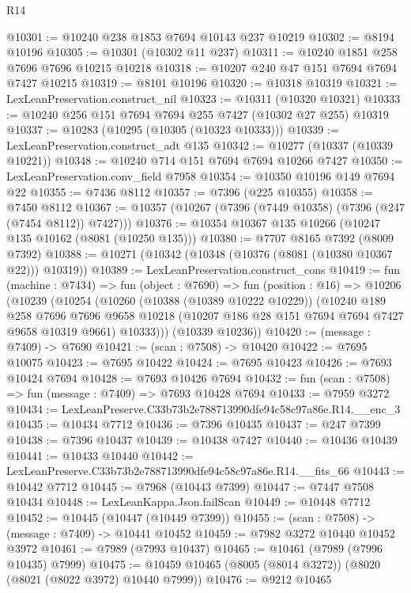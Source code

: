\begin{lexlean}{R14}
\begin{coremodule}
@10301 := @10240 @238 @1853 @7694 @10143 @237 @10219
@10302 := @8194 @10196
@10305 := @10301 (@10302 @11 @237)
@10311 := @10240 @1851 @258 @7696 @7696 @10215 @10218
@10318 := @10207 @240 @47 @151 @7694 @7694 @7427 @10215
@10319 := @8101 @10196
@10320 := @10318 @10319
@10321 := LexLeanPreservation.construct_nil
@10323 := @10311 (@10320 @10321)
@10333 := @10240 @256 @151 @7694 @7694 @255 @7427 (@10302 @27 @255) @10319
@10337 := @10283 (@10295 (@10305 (@10323 @10333)))
@10339 := LexLeanPreservation.construct_adt @135
@10342 := @10277 (@10337 (@10339 @10221))
@10348 := @10240 @714 @151 @7694 @7694 @10266 @7427
@10350 := LexLeanPreservation.conv_field @7958
@10354 := @10350 @10196 @149 @7694 @22
@10355 := @7436 @8112
@10357 := @7396 (@225 @10355)
@10358 := @7450 @8112
@10367 := @10357 (@10267 (@7396 (@7449 @10358) (@7396 (@247 (@7454 @8112)) @7427)))
@10376 := @10354 @10367 @135 @10266 (@10247 @135 @10162 (@8081 (@10250 @135)))
@10380 := @7707 @8165 @7392 (@8009 @7392)
@10388 := @10271 (@10342 (@10348 (@10376 (@8081 (@10380 @10367 @22))) @10319))
@10389 := LexLeanPreservation.construct_cons
@10419 := fun (machine : @7434) =>
  fun (object : @7690) =>
  fun (position : @16) =>
  @10206
    (@10239
      (@10254
        (@10260
          (@10388 (@10389 @10222 @10229))
          (@10240
            @189
            @258
            @7696
            @7696
            @9658
            @10218
            (@10207 @186 @28 @151 @7694 @7694 @7427 @9658 @10319 @9661)
            @10333)))
      (@10339 @10236))
@10420 := (message : @7409) -> @7690
@10421 := (scan : @7508) -> @10420
@10422 := @7695 @10075
@10423 := @7695 @10422
@10424 := @7695 @10423
@10426 := @7693 @10424 @7694
@10428 := @7693 @10426 @7694
@10432 := fun (scan : @7508) => fun (message : @7409) => @7693 @10428 @7694
@10433 := @7959 @3272
@10434 := LexLeanPreserve.C33b73b2e788713990dfe94c58c97a86e.R14.__enc_3
@10435 := @10434 @7712
@10436 := @7396 @10435
@10437 := @247 @7399
@10438 := @7396 @10437
@10439 := @10438 @7427
@10440 := @10436 @10439
@10441 := @10433 @10440
@10442 := LexLeanPreserve.C33b73b2e788713990dfe94c58c97a86e.R14.__fits_66
@10443 := @10442 @7712
@10445 := @7968 (@10443 @7399)
@10447 := @7447 @7508 @10434
@10448 := LexLeanKappa.Json.failScan
@10449 := @10448 @7712
@10452 := @10445 (@10447 (@10449 @7399))
@10455 := (scan : @7508) -> (message : @7409) -> @10441 @10452
@10459 := @7982 @3272 @10440 @10452 @3972
@10461 := @7989 (@7993 @10437)
@10465 := @10461 (@7989 (@7996 @10435) @7999)
@10475 := @10459 @10465 (@8005 (@8014 @3272)) (@8020 (@8021 (@8022 @3972) @10440 @7999))
@10476 := @9212 @10465

\end{coremodule}
\end{lexlean}
